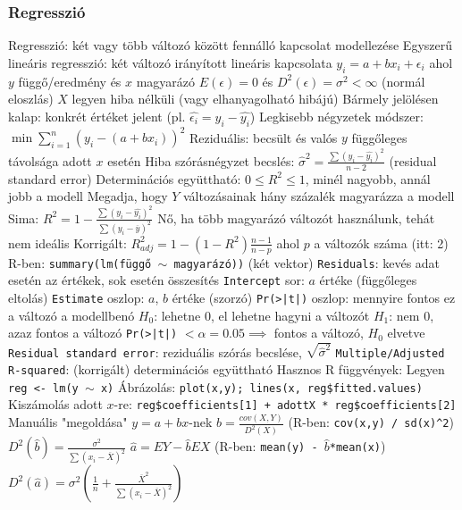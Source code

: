 \documentclass[12pt,a4paper]{article}
\begin{document}
\subsubsection{Regresszió}

\begin{outline}
	\1 Regresszió: két vagy több változó között fennálló kapcsolat modellezése
		\2 Egyszerű lineáris regresszió: két változó irányított lineáris kapcsolata
	\1 $y_i = a + bx_i + \epsilon_i$ ahol $y$ függő/eredmény és $x$ magyarázó
		\2 $E(\epsilon)=0$ és $D^2(\epsilon) = \sigma^2 < \infty$ (normál eloszlás)
		\2 $X$ legyen hiba nélküli (vagy elhanyagolható hibájú)
	\1 Bármely jelölésen kalap: konkrét értéket jelent (pl. $\widehat{\epsilon_i} = y_i - \widehat{y_i}$)
	\1 Legkisebb négyzetek módszer: $\min \sum_{i=1}^{n} ( y_i - (a+bx_i) )^2$
\pagebreak
	\1 Reziduális: becsült és valós $y$ függőleges távolsága adott $x$ esetén
	\1 Hiba szórásnégyzet becslés: $\widehat{\sigma}^2 = \frac{\sum (y_i - \widehat{y_i})^2}{n-2}$
	\;\; (residual standard error)
	\1 Determinációs együttható:
		\2 $0 \le R^2 \le 1$, minél nagyobb, annál jobb a modell
		\2 Megadja, hogy $Y$ változásainak hány százalék magyarázza a modell
		\2 Sima: $R^2 = 1 - \frac{\sum(y_i - \widehat{y_i})^2}{\sum(y_i - \overline{y})^2}$
			\3 Nő, ha több magyarázó változót használunk, tehát nem ideális
		\2 Korrigált: $R^2_{adj} = 1 - (1-R^2) \frac{n-1}{n-p}$ ahol $p$ a változók száma (itt: 2)
	\1 R-ben: \texttt{summary(lm(függő $\sim$ magyarázó))} \;\; (két vektor)
		\2 \texttt{Residuals}: kevés adat esetén az értékek, sok esetén összesítés
		\2 \texttt{Intercept} sor: $a$ értéke (függőleges eltolás)
		\2 \texttt{Estimate} oszlop: $a$, $b$ értéke (szorzó)
		\2 \texttt{Pr(>|t|)} oszlop: mennyire fontos ez a változó a modellbenó
			\3 $H_0$: lehetne 0, el lehetne hagyni a változót
			\3 $H_1$: nem 0, azaz fontos a változó
			\3 \texttt{Pr(>|t|)} $< \alpha = 0.05 \implies$ fontos a változó, $H_0$ elvetve
		\2 \texttt{Residual standard error}: reziduális szórás becslése, $\sqrt{\widehat{\sigma}^2}$
		\2 \texttt{Multiple/Adjusted R-squared}: (korrigált) determinációs együttható
	\1 Hasznos R függvények:
		\2 Legyen \texttt{reg <- lm(y $\sim$ x)}
		\2 Ábrázolás: \texttt{plot(x,y); lines(x, reg\$fitted.values)}
		\2 Kiszámolás adott $x$-re: \texttt{reg\$coefficients[1] + adottX * reg\$coefficients[2]}
	\1 Manuális "megoldása" $y=a+bx$-nek
		\2 $\hat{b} = \frac{cov(X,Y)}{D^2(X)}$ \; (R-ben: \texttt{cov(x,y) / sd(x)\^{}2})
		\2 $D^2(\hat{b}) = \frac{\sigma^2}{\sum(x_i - \overline{X})^2}$
		\2 $\hat{a} = EY - \hat{b}EX$ \; (R-ben: \texttt{mean(y) - $\hat{b}$*mean(x)})
		\2 $D^2(\hat{a}) = \sigma^2(\frac{1}{n} + \frac{\overline{X}^2}{\sum(x_i - \overline{X})^2})$
\end{outline}
\end{document}
